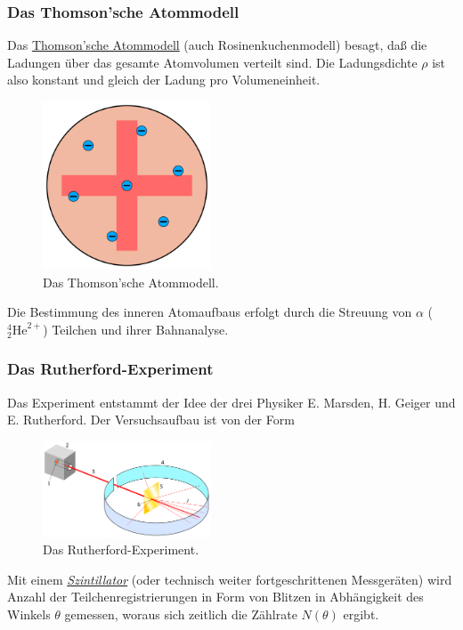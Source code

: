 \documentclass[]{subfiles}
\begin{document}
        \subsubsection*{Das Thomson'sche Atommodell}
            Das \href{https://de.wikipedia.org/wiki/Thomsonsches_Atommodell}{Thomson'sche Atommodell} (auch Rosinenkuchenmodell) besagt, daß die Ladungen über das gesamte Atomvolumen verteilt sind. Die Ladungsdichte $\rho$ ist also konstant und gleich der Ladung pro Volumeneinheit. 
            \begin{figure}[H]
                \centering
                \includegraphics[width=5cm]{Bilddateien/ThomsonModell.png}
                \caption{Das Thomson'sche Atommodell.}
                \label{fig:ThomsonAtom}
            \end{figure}
            Die Bestimmung des inneren Atomaufbaus erfolgt durch die Streuung von $\alpha$ ($_2^4\text{He}^{2+}$) Teilchen und ihrer Bahnanalyse. 

        \subsubsection*{Das Rutherford-Experiment}
            Das Experiment entstammt der Idee der drei Physiker E. Marsden, H. Geiger und E. Rutherford. 
            Der Versuchsaufbau ist von der Form 
            \begin{figure}[H]
                \centering
                \includegraphics[width=5cm]{Bilddateien/Streuversuch_Rutherford.svg.png}
                \caption{Das Rutherford-Experiment.}
                \label{fig:RutherfordExperiment}
            \end{figure}
            Mit einem \href{https://de.wikipedia.org/wiki/Szintillator}{\emph{Szintillator}} (oder technisch weiter fortgeschrittenen Messgeräten) wird Anzahl der Teilchenregistrierungen in Form von Blitzen in Abhängigkeit des Winkels $\theta$ gemessen, woraus sich zeitlich die Zählrate $N(\theta)$ ergibt. 
\end{document}
